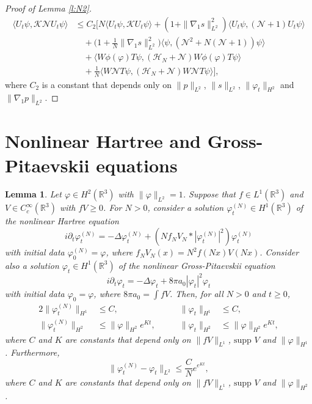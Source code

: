 \documentclass[11pt,a4paper]{scrartcl}
\newtheorem{lem}[thm]{Lemma}
\newcommand{\R}{\mathds{R}}
\newcommand{\N}{\mathcal{N}}
\newcommand{\K}{\mathcal{K}}
\begin{document}
\begin{proof}[Proof of Lemma \ref{l:N2}]
\begin{align*}
    \langle U_t \psi, \K \N U_t \psi \rangle & \le C_2 \Big[ N \langle U_t
    \psi, \K U_t \psi \rangle + (1 + \| \nabla_1 s \|_{L^2}^2) \langle U_t
    \psi, (\N+1) U_t \psi \rangle \\
    & \quad + \big( 1 + \frac{1}{N} \| \nabla_1 s \|_{L^2}^2 \big) \langle
    \psi, (\N^2 + N (\N + 1)) \psi \rangle \\
    & \quad + \langle W \phi(\varphi) T \psi, (\mathcal{H}_N + \N) W
    \phi(\varphi) T \psi \rangle \\
    & \quad + \frac{1}{N} \langle W \N T \psi, (\mathcal{H}_N + \N) W \N T
    \psi \rangle \Big],
  \end{align*}
  where $C_2$ is a constant that depends only on $\| p \|_{L^2}$, $\| s
  \|_{L^2}$, $\| \varphi_t \|_{H^2}$ and $\| \nabla_1 p \|_{L^2}$.
\end{proof}


\section{Nonlinear Hartree and Gross-Pitaevskii equations}


\begin{lem}
  Let $\varphi \in H^2(\R^3)$ with $\| \varphi \|_{L^2} = 1$. Suppose that $f
  \in L^1(\R^3)$ and $V \in C_c^\infty(\R^3)$ with $fV \ge 0$. For $N > 0$,
  consider a solution $\varphi_t^{(N)} \in H^1(\R^3)$ of the nonlinear Hartree
  equation
  \begin{displaymath}
    i \partial_t \varphi_t^{(N)} = - \Delta \varphi_t^{(N)} + (N f_N V_N *
    |\varphi_t^{(N)}|^2) \varphi_t^{(N)}
  \end{displaymath}
  with initial data $\varphi^{(N)}_0 = \varphi$, where $f_N V_N(x) = N^2
  f(Nx)V(Nx)$. Consider also a solution $\varphi_t \in H^1(\R^3)$ of the
  nonlinear Gross-Pitaevskii equation
  \begin{displaymath}
    i \partial_t \varphi_t = - \Delta \varphi_t + 8 \pi a_0 |\varphi_t|^2
    \varphi_t
  \end{displaymath}
  with initial data $\varphi_0 = \varphi$, where $8 \pi a_0 = \int f V$. Then,
  for all $N > 0$ and $t \ge 0$,
  \begin{alignat}{2}
    \| \varphi_t^{(N)} \|_{H^1} & \le C, & \qquad \| \varphi_t \|_{H^1} &
    \le C, \tag{i} \\
    \| \varphi_t^{(N)} \|_{H^2} & \le \| \varphi \|_{H^2} e^{K t}, & \qquad
    \| \varphi_t \|_{H^2} & \le \| \varphi \|_{H^2} e^{K t}, \tag{ii}
  \end{alignat}
  where $C$ and $K$ are constants that depend only on $\| fV \|_{L^1}$,
  $\text{supp }V$ and $\| \varphi \|_{H^1}$. Furthermore,
  \begin{equation}
    \| \varphi_t^{(N)} - \varphi_t \|_{L^2} \le \frac{C}{N} e^{e^{K t}},
    \tag{iii}
  \end{equation}
  where $C$ and $K$ are constants that depend only on $\| fV \|_{L^1}$,
  $\text{supp }V$ and $\| \varphi \|_{H^2}$.
\end{lem}
\end{document}
